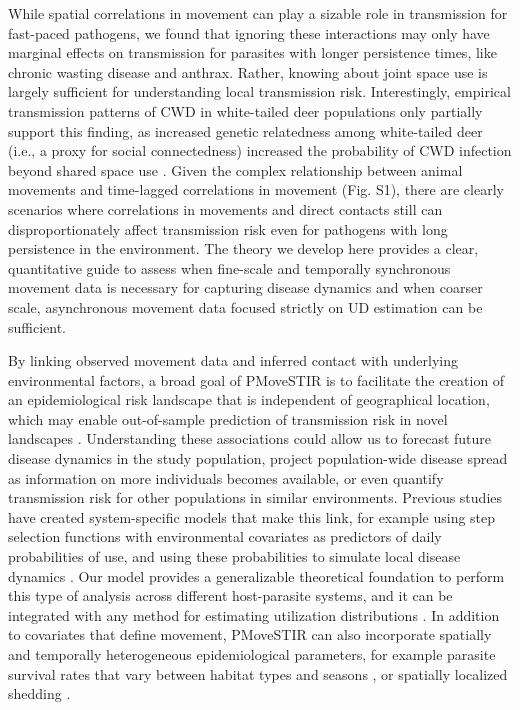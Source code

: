 \documentclass[letterpaper]{article}
\begin{document}
While spatial correlations in movement can play a sizable role in transmission for fast-paced pathogens, we found that ignoring these interactions may only have marginal effects on transmission for parasites with longer persistence times, like chronic wasting disease and anthrax.  Rather, knowing about joint space use is largely sufficient for understanding local transmission risk.  Interestingly, empirical transmission patterns of CWD in white-tailed deer populations only partially support this finding, as increased genetic relatedness among white-tailed deer (i.e., a proxy for social connectedness) increased the probability of CWD infection beyond shared space use \citep{Grear2010}. Given the complex relationship between animal movements and time-lagged correlations in movement (Fig. S1), there are clearly scenarios where correlations in movements and direct contacts still can disproportionately affect transmission risk even for pathogens with long persistence in the environment. The theory we develop here provides a clear, quantitative guide to assess when fine-scale and temporally synchronous movement data is necessary for capturing disease dynamics and when coarser scale, asynchronous movement data focused strictly on UD estimation can be sufficient.

By linking observed movement data and inferred contact with underlying environmental factors, a broad goal of PMoveSTIR is to facilitate the creation of an epidemiological risk landscape that is independent of geographical location, which may enable out-of-sample prediction of transmission risk in novel landscapes \citep{Manlove2022}. Understanding these associations could allow us to forecast future disease dynamics in the study population, project population-wide disease spread as information on more individuals becomes available, or even quantify transmission risk for other populations in similar environments. Previous studies have created system-specific models that make this link, for example using step selection functions with environmental covariates as predictors of daily probabilities of use, and using these probabilities to simulate local disease dynamics \citep{Merkle2018}. Our model provides a generalizable theoretical foundation to perform this type of analysis across different host-parasite systems, and it can be integrated with any method for estimating utilization distributions \citep{Signer2017,Merkle2018,Michelot2020,Potts2023}. In addition to covariates that define movement, PMoveSTIR can also incorporate spatially and temporally heterogeneous epidemiological parameters, for example parasite survival rates that vary between habitat types and seasons \citep{Daversa2017}, or spatially localized shedding \citep{Weinstein2018a}. 
\end{document}
